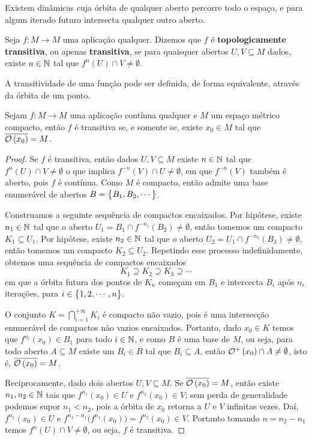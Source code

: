 Existem dinâmicas cuja órbita de qualquer aberto percorre todo o espaço, e para algum iterado futuro intersecta qualquer outro aberto.

\begin{definicao} Seja $f:M\to M$ uma aplicação qualquer. Dizemos que $f$ é \textbf{topologicamente transitiva}, ou apenas \textbf{transitiva}, se para quaisquer abertos $U,V\subseteq M$ dados, existe $n\in\mathbb{N}$ tal que $f^n(U)\cap V\neq\emptyset$.
\end{definicao}

A transitividade de uma função pode ser definida, de forma equivalente, através da órbita de um ponto.

\begin{proposicao}\label{minimaltransitiva} Sejam $f:M\to M$ uma aplicação contínua qualquer e $M$ um espaço métrico compacto, então $f$ é transitiva se, e somente se, existe $x_0\in M$ tal que $\overline{\mathcal{O}\left(x_0\right)}=M$.
\end{proposicao}

\begin{proof} Se $f$ é transitiva, então dados $U,V\subseteq M$ existe $n\in\mathbb{N}$ tal que $f^n(U)\cap V\neq\emptyset$ o que implica $f^{-n}(V)\cap U\neq\emptyset$, em que $f^{-n}(V)$ também é aberto, pois $f$ é contínua. Como $M$ é compacto, então admite uma base enumerável de abertos $B=\big\{B_1,B_2,\cdots\big\}$.

Construamos a seguinte sequência de compactos encaixados. Por hipótese, existe $n_1\in\mathbb{N}$ tal que o aberto $U_1=B_1\cap f^{-n_1}(B_2)\neq\emptyset$, então tomemos um compacto $K_1\subseteq U_1$. Por hipótese, existe $n_2\in\mathbb{N}$ tal que o aberto $U_2=U_1\cap f^{-n_2}(B_3)\neq\emptyset$, então tomemos um compacto $K_2\subseteq U_2$. Repetindo esse processo indefinidamente, obtemos uma sequência de compactos encaixados $$K_1\supseteq K_2\supseteq K_3\supseteq\cdots$$ em que a órbita futura dos pontos de $K_n$ começam em $B_1$ e intercecta $B_i$ após $n_i$ iterações, para $i\in\big\{1,2,\cdots,n\big\}$.

O conjunto $K=\bigcap_{i=1}^{+\infty}K_i$ é compacto não vazio, pois é uma intersecção enumerável de compactos não vazios encaixados. Portanto, dado $x_0\in K$ temos que $f^{n_i}(x_0)\in B_1$ para todo $i\in\mathbb{N}$, e como $B$ é uma base de $M$, ou seja, para todo aberto $A\subseteq M$ existe um $B_i\in B$ tal que $B_i\subseteq A$, então $\mathcal{O}^{+}\left(x_0\right)\cap A\neq\emptyset$, isto é, $\overline{\mathcal{O}\left(x_0\right)}=M$.

Reciprocamente, dado dois abertos $U,V\subseteq M$. Se $\overline{\mathcal{O}\left(x_0\right)}=M$, então existe $n_1,n_2\in\mathbb{N}$ tais que $f^{n_1}(x_0)\in U$ e $f^{n_2}(x_0)\in V$; sem perda de generalidade podemos supor $n_1<n_2$, pois a órbita de $x_0$ retorna a $U$ e $V$ infinitas vezes. Daí, $f^{n_1}(x_0)\in U$ e $f^{n_2-n_1}\big(f^{n_1}(x_0)\big)=f^{n_2}(x_0)\in V$. Portanto tomando $n=n_2-n_1$ temos $f^n(U)\cap V\neq\emptyset$, ou seja, $f$ é transitiva.
\end{proof}

